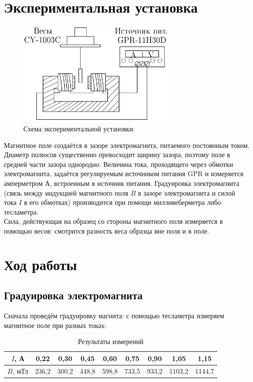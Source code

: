 \documentclass[a4paper, 12pt]{article}
\begin{document}
	\section*{Экспериментальная установка}
	
	\begin{figure}
		\centering
		\includegraphics[width = 0.7\textwidth, height = 0.3\textheight]{ustanovka}
		\caption{Схема экспериментальной установки.}
	\end{figure}
	
	
	Магнитное поле создаётся в зазоре электромагнита, питаемого постоянным током. Диаметр полюсов существенно превосходит ширину зазора, поэтому поле в средней части зазора однородно. Величина тока, проходящего через обмотки электромагнита, задаётся регулируемым источником питания GPR и измеряется амперметром $ А $, встроенным в источник питания. Градуировка электромагнита (связь между индукцией магнитного поля $ B $ в зазоре электромагнита и силой тока $ I $ в его обмотках) производится при помощи милливеберметра либо тесламетра.\\
	Сила, действующая на образец со стороны магнитного поля измеряется в помощью весов: смотрится разность веса образца вне поля и в поле.
	
	\section*{Ход работы}
	
	\subsection*{Градуировка электромагнита}
	
	Сначала проведём градуировку магнита: с помощью тесламетра измеряем магнитное поле при разных токах:
	
	\begin{table}[H]
		\centering
		\begin{tabular}{|c|c|c|c|c|c|c|c|c|}
			\hline
			$ I $, А   & 0,22   & 0,30   & 0,45   & 0,60   & 0,75   & 0,90   & 1,05   & 1,15 \\ \hline
			$ B $, мТл & 236,2 & 300,2 & 448,8 & 598,8 & 733,5 & 933,2 & 1103,2 & 1144,7 \\ \hline 
		\end{tabular}
		\caption{Результаты измерений}
	\end{table}
	
\end{document}
